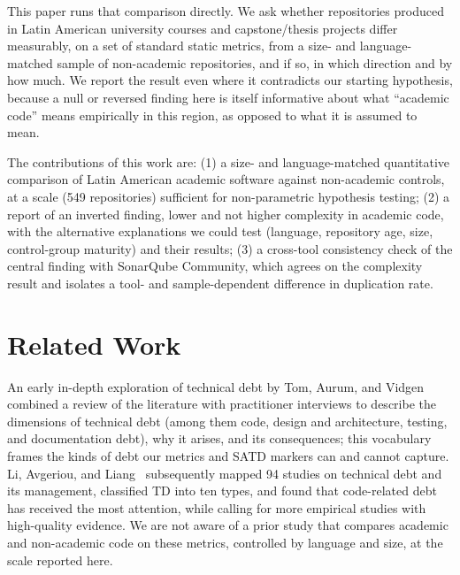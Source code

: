\documentclass{cleiej}
\providecommand{\citep}[1]{\cite{#1}}
\begin{document}
This paper runs that comparison directly. We ask whether repositories produced in Latin American university courses and capstone/thesis projects differ measurably, on a set of standard static metrics, from a size- and language-matched sample of non-academic repositories, and if so, in which direction and by how much. We report the result even where it contradicts our starting hypothesis, because a null or reversed finding here is itself informative about what ``academic code'' means empirically in this region, as opposed to what it is assumed to mean.

The contributions of this work are: (1) a size- and language-matched quantitative comparison of Latin American academic software against non-academic controls, at a scale (549 repositories) sufficient for non-parametric hypothesis testing; (2) a report of an inverted finding, lower and not higher complexity in academic code, with the alternative explanations we could test (language, repository age, size, control-group maturity) and their results; (3) a cross-tool consistency check of the central finding with SonarQube Community, which agrees on the complexity result and isolates a tool- and sample-dependent difference in duplication rate.

\section{Related Work}

An early in-depth exploration of technical debt by Tom, Aurum, and Vidgen~\citep{tom2013exploration} combined a review of the literature with practitioner interviews to describe the dimensions of technical debt (among them code, design and architecture, testing, and documentation debt), why it arises, and its consequences; this vocabulary frames the kinds of debt our metrics and SATD markers can and cannot capture. Li, Avgeriou, and Liang~\citep{li2015mapping} subsequently mapped 94 studies on technical debt and its management, classified TD into ten types, and found that code-related debt has received the most attention, while calling for more empirical studies with high-quality evidence. We are not aware of a prior study that compares academic and non-academic code on these metrics, controlled by language and size, at the scale reported here.
\end{document}
